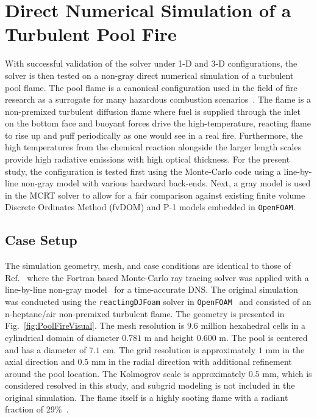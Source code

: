 \section{Direct Numerical Simulation of a Turbulent Pool Fire}\label{section:DNSPoolFire}
With successful validation of the solver under 1-D and 3-D configurations, the solver is then tested on a non-gray direct numerical simulation of a turbulent pool flame. The pool flame is a canonical configuration used in the field of fire research as a surrogate for many hazardous combustion scenarios~\cite{Chen2023PoolAdvances}. 
The flame is a non-premixed turbulent diffusion flame where fuel is supplied through the inlet on the bottom face and buoyant forces drive the high-temperature, reacting flame to rise up and puff periodically as one would see in a real fire.
Furthermore, the high temperatures from the chemical reaction alongside the larger length scales provide high radiative emissions with high optical thickness. For the present study, the configuration is tested first using the Monte-Carlo code using a line-by-line non-gray model with various hardward back-ends. 
Next, a gray model is used in the MCRT solver to allow for a fair comparison against existing finite volume Discrete Ordinates Method (fvDOM) and P-1 models embedded in \texttt{OpenFOAM}.

\subsection{Case Setup}
The simulation geometry, mesh, and case conditions are identical to those of Ref.~\cite{Wu2020DetailedFire} where the Fortran based Monte-Carlo ray tracing solver was applied with a line-by-line non-gray model~\cite{Ren2019Line-by-lineSystem} for a time-accurate DNS. The original simulation was conducted using the \texttt{reactingDJFoam} solver in \texttt{OpenFOAM}~\cite{Wu2019AFlame} and consisted of an n-heptane/air non-premixed turbulent flame. The geometry is presented in Fig.~\ref{fig:PoolFireVisual}. The mesh resolution is $9.6$ million hexahedral cells in a cylindrical domain of diameter $0.781$ m and height $0.600$ m. The pool is centered and has a diameter of $7.1$ cm. The grid resolution is approximately $1$ mm in the axial direction and $0.5$ mm in the radial direction with additional refinement around the pool location. The Kolmogrov scale is approximately $0.5$ mm, which is considered resolved in this study, and subgrid modeling is not included in the original simulation. 
The flame itself is a highly sooting flame with a radiant fraction of 29\%~\cite{Wu2020DetailedFire}. 


